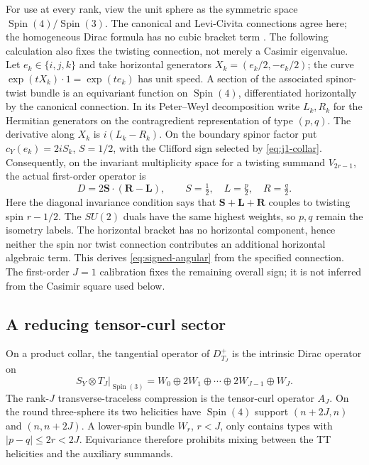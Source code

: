 \documentclass[11pt]{article}
\theoremstyle{definition}
\newcommand{\Spin}{\operatorname{Spin}}
\begin{document}
For use at every rank, view the unit sphere as the symmetric space
$\Spin(4)/\Spin(3)$.  The canonical and Levi-Civita connections agree here;
the homogeneous Dirac formula has no cubic bracket term
\cite[Sections~2--3]{Agricola2002}. The following calculation also fixes the
twisting connection, not merely a Casimir eigenvalue.
Let $e_k\in\{i,j,k\}$ and take horizontal generators
$X_k=(e_k/2,-e_k/2)$; the curve $\exp(tX_k)\cdot1=\exp(te_k)$ has unit
speed. A section of the associated spinor-twist bundle is an equivariant
function on $\Spin(4)$, differentiated horizontally by the canonical
connection. In its Peter--Weyl decomposition write $L_k,R_k$ for the
Hermitian generators on the contragredient representation of type $(p,q)$.
The derivative along $X_k$ is $i(L_k-R_k)$. On the boundary spinor factor
put $c_Y(e_k)=2iS_k$, $S=1/2$, with the Clifford sign selected by
\eqref{eq:j1-collar}. Consequently, on the invariant multiplicity space
for a twisting summand $V_{2r-1}$, the actual first-order operator is
\begin{equation}\label{eq:signed-angular}
 D=2\boldsymbol S\mathbin{\cdot}(\boldsymbol R-\boldsymbol L),
 \qquad S=\tfrac12,\quad L=\tfrac p2,\quad R=\tfrac q2.
\end{equation}
Here the diagonal invariance condition says that $\boldsymbol S+\boldsymbol
L+\boldsymbol R$ couples to twisting spin $r-1/2$. The $SU(2)$ duals have
the same highest weights, so $p,q$ remain the isometry labels. The
horizontal bracket has no horizontal component, hence neither the spin nor
twist connection contributes an additional horizontal algebraic term.
This derives \eqref{eq:signed-angular} from the specified connection. The
first-order $J=1$ calibration fixes the remaining overall sign; it is not
inferred from the Casimir square used below.

\subsection{A reducing tensor-curl sector}

On a product collar, the tangential operator of $D^+_{T_J}$ is the intrinsic
Dirac operator on
\[
 S_Y\otimes T_J|_{\Spin(3)}
 =W_0\oplus2W_1\oplus\cdots\oplus2W_{J-1}\oplus W_J.
\]
The rank-$J$ transverse-traceless compression is the tensor-curl operator
$A_J$.  On the round three-sphere its two helicities have $\Spin(4)$ support
$(n+2J,n)$ and $(n,n+2J)$.  A lower-spin bundle $W_r$, $r<J$, only contains
types with $|p-q|\leq2r<2J$.  Equivariance therefore prohibits mixing between
the TT helicities and the auxiliary summands.
\end{document}
